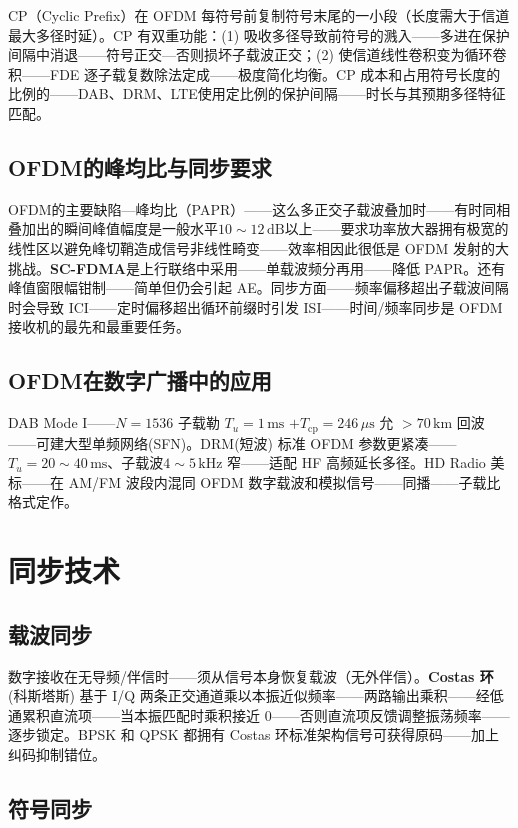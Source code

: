 \documentclass[12pt,UTF8]{ctexbook}
\begin{document}
CP（Cyclic Prefix）在 OFDM 每符号前复制符号末尾的一小段（长度需大于信道最大多径时延）。CP 有双重功能：(1) 吸收多径导致前符号的溅入——多进在保护间隔中消退——符号正交—否则损坏子载波正交；(2) 使信道线性卷积变为循环卷积——FDE 逐子载复数除法定成——极度简化均衡。CP 成本和占用符号长度的比例的——DAB、DRM、LTE使用定比例的保护间隔——时长与其预期多径特征匹配。

\subsection{OFDM的峰均比与同步要求}

OFDM的主要缺陷—峰均比（PAPR）——这么多正交子载波叠加时——有时同相叠加出的瞬间峰值幅度是一般水平$10\sim12\,\mathrm{dB}$以上——要求功率放大器拥有极宽的线性区以避免峰切鞘造成信号非线性畸变——效率相因此很低是 OFDM 发射的大挑战。\textbf{SC-FDMA}是上行联络中采用——单载波频分再用——降低 PAPR。还有峰值窗限幅钳制——简单但仍会引起 AE。同步方面——频率偏移超出子载波间隔时会导致 ICI——定时偏移超出循环前缀时引发 ISI——时间/频率同步是 OFDM 接收机的最先和最重要任务。

\subsection{OFDM在数字广播中的应用}

DAB Mode I——$N=1536$ 子载勒 $T_u=1\,\mathrm{ms}$ $ + T_{\mathrm{cp}}=246\,\mu\mathrm{s}$ 允 $>70\,\mathrm{km}$ 回波——可建大型单频网络(SFN)。DRM(短波) 标准 OFDM 参数更紧凑——$T_u = 20\sim40\,\mathrm{ms}$、子载波$4\sim5\,\mathrm{kHz}$ 窄——适配 HF 高频延长多径。HD Radio 美标——在 AM/FM 波段内混同 OFDM 数字载波和模拟信号——同播——子载比格式定作。

\section{同步技术}
\label{sec:synchronization}

\subsection{载波同步}

数字接收在无导频/伴信时——须从信号本身恢复载波（无外伴信）。\textbf{Costas 环}(科斯塔斯) 基于 I/Q 两条正交通道乘以本振近似频率——两路输出乘积——经低通累积直流项——当本振匹配时乘积接近 0——否则直流项反馈调整振荡频率——逐步锁定。BPSK 和 QPSK 都拥有 Costas 环标准架构信号可获得原码——加上纠码抑制错位。

\subsection{符号同步}
\end{document}
